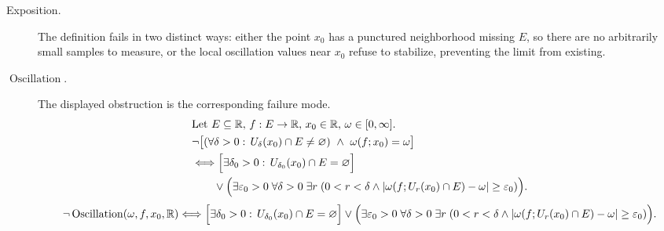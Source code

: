 \begin{remark*}
\begin{description}
  \item[Exposition.]
The definition fails in two distinct ways: either the point $x_0$ has a punctured neighborhood missing $E$, so there are no arbitrarily small samples to measure, or the local oscillation values near $x_0$ refuse to stabilize, preventing the limit from existing.


  \item[\(\operatorname{Oscillation}.\)]
  The displayed obstruction is the corresponding failure mode.
  \[
\begin{aligned}
&\text{Let } E \subseteq \mathbb{R},\, f:E \to \mathbb{R},\, x_0 \in \mathbb{R},\, \omega \in [0,\infty].\\
&\neg\bigl[(\forall \delta>0:\, U_\delta(x_0)\cap E \neq \varnothing)\ \land\ \omega(f;x_0)=\omega\bigr]\\
&\Longleftrightarrow
\Bigl[\exists \delta_0>0:\, U_{\delta_0}(x_0)\cap E = \varnothing\Bigr]\\
&\qquad\lor
\Bigl(\exists \varepsilon_0>0\; \forall \delta>0\; \exists r\;(0<r<\delta \land |\omega(f;U_r(x_0)\cap E)-\omega| \ge \varepsilon_0)\Bigr).
\end{aligned}
  \]
  \[
\neg\operatorname{Oscillation}(\omega,f,x_0,\mathbb{R})
\Longleftrightarrow
\Bigl[\exists \delta_0>0:\, U_{\delta_0}(x_0)\cap E = \varnothing\Bigr]
\lor
\Bigl(\exists \varepsilon_0>0\; \forall \delta>0\; \exists r\;(0<r<\delta \land |\omega(f;U_r(x_0)\cap E)-\omega| \ge \varepsilon_0)\Bigr).
  \]
\end{description}
\end{remark*}

